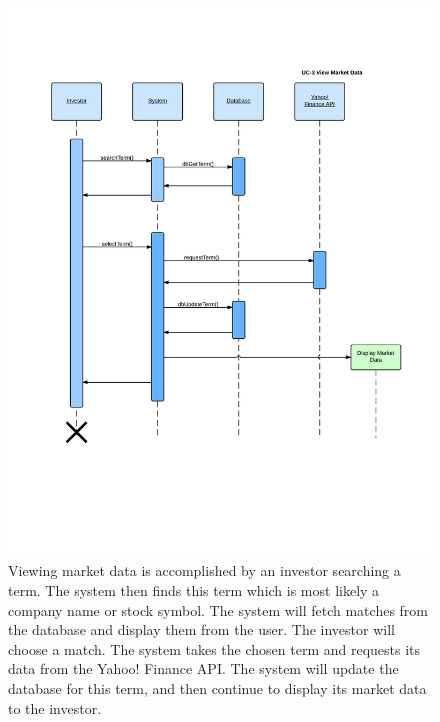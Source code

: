 \begin{figure}[H]
\centering
\includegraphics[width=5.5in]{./img/inter/uc3.jpg}
\caption
{Viewing market data is accomplished by
an investor searching a term. The system then finds this term which is
most likely a company name or stock symbol. The system will fetch matches
from the database and display them from the user. The investor will choose
a match. The system takes the chosen term and requests its data from the
Yahoo! Finance API. The system will update the database for this term, and
then continue to display its market data to the investor.}
\end{figure}



